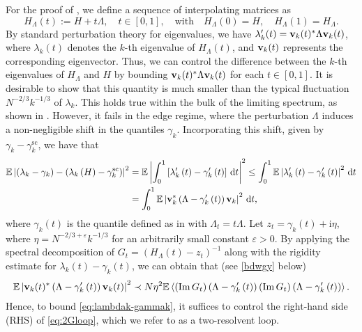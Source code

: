 \documentclass[10pt,reqno]{amsart}
\numberwithin{equation}{section}
\numberwithin{figure}{section}
\theoremstyle{plain} %
\theoremstyle{definition} %
\newcommand{\VV}{H_{\Lambda}}
\renewcommand{\txt}[1]{\text{\rm{#1}}}
\newcommand{\E}{\mathbb{E}}
\newcommand{\ii}{\mathrm{i}}
\renewcommand{\leq}{\le}
\newcommand{\pa}[1]{\left({#1}\right)}
\newcommand{\absa}[1]{\left\lvert #1 \right\rvert}
\newcommand{\avga}[1]{\left\langle #1 \right\rangle}
\DeclareMathOperator{\im}{\mathrm{Im}}
\newcommand{\bv}{{\bf{v}}}
\newcommand{\be}{\begin{equation}}
\newcommand{\ee}{\end{equation}}
\newcommand{\e}{{\varepsilon}}
\newcommand{\rd}{\mathrm{d}}
\numberwithin{equation}{section}
\begin{document}
For the proof of , we define a sequence of interpolating matrices as 
\be\label{eq:VVtheta}
\VV(t):=H+t \Lambda, \quad t\in [0,1], \quad \text{with}\quad \VV(0)=H, \quad \VV(1)=\VV.
\ee
By standard perturbation theory for eigenvalues, we have 
$\lambda_k'(t)=\bv_k(t)^* \Lambda \bv_k(t)$, where $\lambda_k(t)$ denotes the $k$-th eigenvalue of $\VV(t)$, and $\bv_k(t)$ represents the corresponding eigenvector.
Thus, we can control the difference between the $k$-th eigenvalues of $H_\Lambda$ and $H$ by bounding $\bv_k(t)^* \Lambda \bv_k(t)$ for each $t\in[0,1]$. It is desirable to show that this quantity is much smaller than the typical fluctuation $N^{-2/3}k^{-1/3}$ of $\lambda_k$. This holds true within the bulk of the limiting spectrum, as shown in \cite{stone2024randommatrixmodelquantum}. 
However, it fails in the edge regime, where the perturbation $\Lambda$ induces a non-negligible shift in the quantiles $\gamma_k$. Incorporating this shift, given by $\gamma_k-\gamma_k^{\mathrm{sc}}$, we have that 
\begin{equation}\label{eq:lambdak-gammak}
    \begin{aligned}
  \E\absa{\pa{\lambda_k-\gamma_k}-\pa{\lambda_k\pa{H}-\gamma_k^\txt{sc}}}^2&=\E\absa{\int_{0}^1\left[\lambda_k'\pa{t}-\gamma_k'\pa{t}\right]\,\rd t}^2\leq  \int_{0}^1\E\absa{\lambda_k'\pa{t}-\gamma_k'\pa{t}}^2\,\rd t\\  &=\int_{0}^1\E\absa{\bv_k^*\pa{\Lambda-\gamma_k'\pa{t}}\bv_k}^2\,\rd t,
    \end{aligned}
\end{equation}
where $\gamma_k\pa{t}$ is the quantile defined as in  with $\Lambda_t=t\Lambda$. 
Let $z_t=\gamma_k\pa{t}+\ii\eta$, where $\eta=N^{-2/3+\varepsilon}k^{-1/3}$ for an arbitrarily small constant $\e>0$. By applying the spectral decomposition of $G_t=(\VV(t)-z_t)^{-1}$ along with the rigidity estimate for $\lambda_k(t)-\gamma_k(t)$, we can obtain that (see \eqref{bdwgy} below)
\begin{equation}\label{eq:2Gloop}
    \begin{aligned}     \E\absa{\bv_k(t)^*\pa{\Lambda-\gamma_k'\pa{t}}\bv_k(t)}^2\prec N\eta^2\E\avga{\pa{\im G_t}\pa{\Lambda-\gamma_k'\pa{t}}\pa{\im G_t}\pa{\Lambda-\gamma_k'\pa{t}}}.
    \end{aligned}
\end{equation}
Hence, to bound \eqref{eq:lambdak-gammak}, it suffices to control the right-hand side (RHS) of \eqref{eq:2Gloop}, which we refer to as a two-resolvent loop. 
\end{document}
